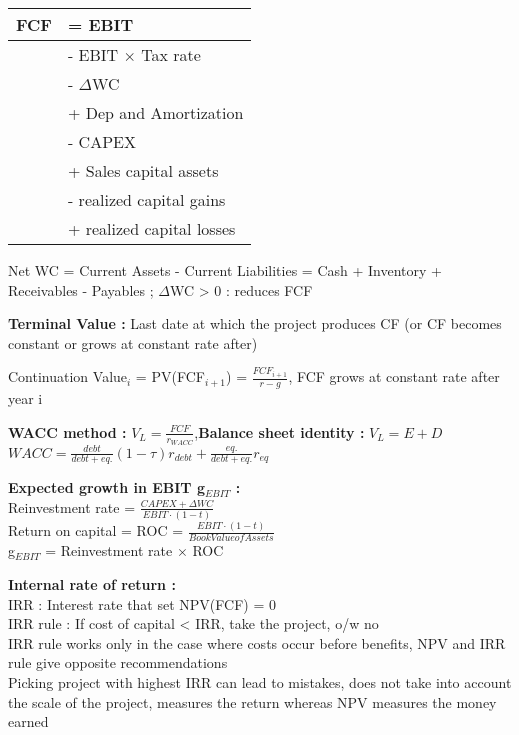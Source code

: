 \documentclass[a4paper,twocolumn]{article}
\begin{document}
\vspace{-0.7cm}

\begin{center}
	\begin{tabular}{|l|l|}
	\hline
	FCF & = EBIT\\
	\hline
	& - EBIT $\times$ Tax rate\\
	\hline
	& - $\Delta$WC\\
	\hline
	& + Dep and Amortization\\
	\hline
	& - CAPEX\\
	\hline
	& + Sales capital assets\\
	\hline
	& - realized capital gains\\
	\hline 
	& + realized capital losses\\
	\hline
	\end{tabular}
\end{center}

\vspace{-0.3cm}

Net WC = Current Assets - Current Liabilities = Cash + Inventory + Receivables - Payables ; 
$\Delta$WC > 0 : reduces FCF

\textbf{Terminal Value :} Last date at which the project produces CF (or CF becomes constant or grows at constant rate after)

Continuation Value$_i$ = PV(FCF$_{i+1}$) = $\frac{FCF_{i+1}}{r-g}$, FCF grows at constant rate after year i

\textbf{WACC method :} $V_L = \frac{FCF}{r_{WACC}}$,\textbf{Balance sheet identity :} $V_L = E + D$ \\
$WACC=\frac{debt}{debt+eq.}  (1-\tau)  r_{debt} +\frac{eq.}{debt+eq.}   r_{eq} $


\textbf{Expected growth in EBIT g$_{EBIT}$  :}\\
Reinvestment rate = $\frac{CAPEX + \Delta WC}{EBIT\cdot(1-t)}$\\
Return on capital = ROC = $\frac{EBIT\cdot(1-t)}{Book Value of Assets}$\\
g$_{EBIT}$ = Reinvestment rate $\times$ ROC

\textbf{Internal rate of return :}\\
IRR : Interest rate that set NPV(FCF) = 0\\
IRR rule : If cost of capital < IRR, take the project, o/w no\\
IRR rule works only in the case where costs occur before benefits, NPV and IRR rule give opposite recommendations\\
Picking project with highest IRR can lead to mistakes, does not take into account the scale of the project, measures the return whereas NPV measures the money earned
\end{document}
